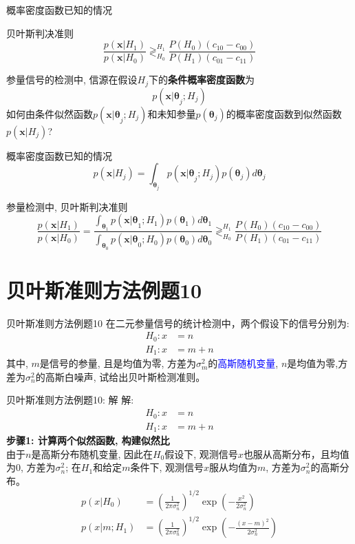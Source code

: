 \begin{frame}[shrink]{概率密度函数已知的情况}
\begin{block}{贝叶斯判决准则}
	\[ \frac{p(\bm{x}|H_1)}{p(\bm{x}|H_0)}\mathop{\gtrless}_{H_0}^{H_1}\frac{P(H_0)(c_{10}-c_{00})}{P(H_1)(c_{01}-c_{11})} \]
\end{block}
参量信号的检测中, 信源在假设$H_j$下的\textbf{条件概率密度函数}为
\[ p(\bm{x|\theta}_j; H_j)\]
如何由条件似然函数$p(\bm{x|\theta}_j; H_j)$和未知参量$p(\bm{\theta}_j)$的概率密度函数到似然函数$p(\bm{x}|H_j)$?
\end{frame}

\begin{frame}[shrink]{概率密度函数已知的情况}
\[ p(\bm{x}|H_j)=\int_{\bm{\theta}_j}p(\bm{x|\theta}_j; H_j)p(\bm{\theta}_j)d\bm{\theta}_j   \]
\begin{block}{参量检测中, 贝叶斯判决准则}
	\[ \frac{p(\bm{x}|H_1)}{p(\bm{x}|H_0)}=\frac{\int_{\bm{\theta}_1}p(\bm{x|\theta}_1; H_1)p(\bm{\theta}_1)d\bm{\theta}_1}{\int_{\bm{\theta}_0}p(\bm{x|\theta}_0; H_0)p(\bm{\theta}_0)d\bm{\theta}_0}\mathop{\gtrless}_{H_0}^{H_1}\frac{P(H_0)(c_{10}-c_{00})}{P(H_1)(c_{01}-c_{11})} \]
\end{block}
\end{frame}

\section{贝叶斯准则方法例题10}

\begin{frame}{贝叶斯准则方法例题10}
在二元参量信号的统计检测中，两个假设下的信号分别为:
\begin{align*}
H_0: x&=n  \\
H_1: x&=m+n
\end{align*}
其中, $m$是信号的参量, 且是均值为零, 方差为$\sigma_m^2$的\textcolor{blue}{高斯随机变量}, $n$是均值为零,方差为$\sigma_n^2$的高斯白噪声,  试给出贝叶斯检测准则。\\
\end{frame}

\begin{frame}[shrink]{贝叶斯准则方法例题10: 解}
解: 
\begin{align*}
H_0: x&=n\\
H_1: x&=m+n
\end{align*}
\textbf{步骤1: 计算两个似然函数, 构建似然比}\\
由于$n$是高斯分布随机变量, 因此在$H_0$假设下, 观测信号$x$也服从高斯分布，且均值为0, 方差为$\sigma_n^2$; 在$H_1$和给定$m$条件下, 观测信号$x$服从均值为$m$, 方差为$\sigma_n^2$的高斯分布。
\begin{align*}
p(x|H_0)&=\left(\frac{1}{2\pi\sigma_n^2}\right)^{1/2}\exp\left(-\frac{x^2}{2\sigma_n^2}\right)\\
p(x|m; H_1)&=\left(\frac{1}{2\pi\sigma_n^2}\right)^{1/2}\exp\left(-\frac{(x-m)^2}{2\sigma_n^2}\right)
\end{align*} 
\end{frame}

